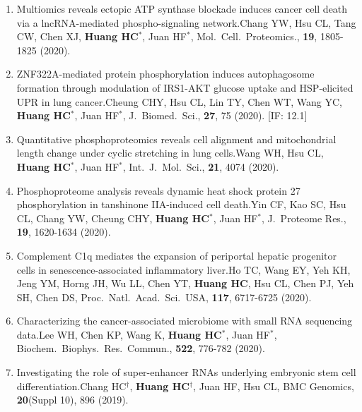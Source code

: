 \documentclass[10pt,a4paper]{article}
\def\mypub#1#2#3{{#1.}\newline #2, #3.}
\begin{document}
\begin{enumerate}
\item
\mypub{Multiomics reveals ectopic ATP synthase blockade induces cancer cell death via a lncRNA-mediated phospho-signaling network}
{Chang YW, Hsu CL, Tang CW, Chen XJ, {\bf Huang HC$^*$}, Juan HF$^*$}
{Mol.\ Cell.\ Proteomics., {\bf 19}, 1805-1825 (2020)}

\item
\mypub{ZNF322A-mediated protein phosphorylation induces autophagosome formation through modulation of IRS1-AKT glucose uptake and HSP-elicited UPR in lung cancer}
{Cheung CHY, Hsu CL, Lin TY,  Chen WT, Wang YC, {\bf Huang HC$^*$}, Juan HF$^*$}
{J.\ Biomed.\ Sci., {\bf 27}, 75 (2020)}
[IF: 12.1]

\item
\mypub{Quantitative phosphoproteomics reveals cell alignment and 
mitochondrial length change under cyclic stretching in lung cells}
{Wang WH, Hsu CL, {\bf Huang HC$^*$}, Juan HF$^*$}
{Int.\ J.\ Mol.\ Sci., {\bf 21}, 4074 (2020)}

\item
\mypub{Phosphoproteome analysis reveals dynamic heat shock protein 27 phosphorylation in tanshinone IIA-induced cell death}
{Yin CF, Kao SC, Hsu CL, Chang YW, Cheung CHY, {\bf Huang HC$^*$}, Juan HF$^*$}
{J.\ Proteome Res., {\bf 19}, 1620-1634 (2020)}

\item
\mypub{Complement C1q mediates the expansion of periportal hepatic progenitor cells in senescence-associated inflammatory liver}
{Ho TC, Wang EY, Yeh KH, Jeng YM, Horng JH, Wu LL, Chen YT, {\bf Huang HC}, Hsu CL, Chen PJ, Yeh SH, Chen DS}
{Proc.\ Natl.\ Acad.\ Sci.\ USA, {\bf 117}, 6717-6725 (2020)}

\item
\mypub{Characterizing the cancer-associated microbiome with small RNA sequencing data}
{Lee WH, Chen KP, Wang K, {\bf Huang HC$^*$}, Juan HF$^*$}
{Biochem.\ Biophys.\ Res.\ Commun., {\bf 522}, 776-782 (2020)}

\item
\mypub{Investigating the role of super-enhancer RNAs underlying embryonic stem cell differentiation}
{Chang HC$^\dagger$, {\bf Huang HC$^\dagger$}, Juan HF, Hsu CL}
{BMC Genomics, {\bf 20}(Suppl 10), 896 (2019)}


\end{enumerate}
\end{document}
